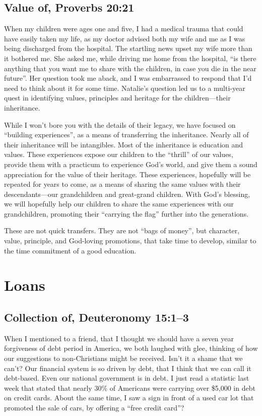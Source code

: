 \documentclass[12pt]{memoir}
\begin{document}
\subsection{Value of, Proverbs 20:21}

When my children were ages one and five, I had a medical trauma that
could have easily taken my life, as my doctor advised both my wife
and me as I was being discharged from the hospital. The startling
news upset my wife more than it bothered me. She asked me, while driving
me home from the hospital, ``is there anything that you want me to
share with the children, in case you die in the near future''. Her
question took me aback, and I was embarrassed to respond that I'd
need to think about it for some time. Natalie's question led us to
a multi-year quest in identifying values, principles and heritage
for the children---their inheritance.

While I won't bore you with the details of their legacy, we have focused
on ``building experiences'', as a means of transferring the inheritance.
Nearly all of their inheritance will be intangibles. Most of the inheritance
is education and values. These experiences expose our children to
the ``thrill'' of our values, provide them with a practicum to experience
God's world, and give them a sound appreciation for the value of their
heritage. These experiences, hopefully will be repeated for years
to come, as a means of sharing the same values with their descendants---our
grandchildren and great-grand children. With God's blessing, we will
hopefully help our children to share the same experiences with our
grandchildren, promoting their ``carrying the flag'' further into
the generations.

These are not quick transfers. They are not ``bags of money'', but
character, value, principle, and God-loving promotions, that take
time to develop, similar to the time commitment of a good education. 

\section{Loans}

\subsection{Collection of, Deuteronomy 15:1--3}

When I mentioned to a friend, that I thought we should have a seven
year forgiveness of debt period in America, we both laughed with glee,
thinking of how our suggestions to non-Christians might be received.
Isn't it a shame that we can't? Our financial system is so driven
by debt, that I think that we can call it debt-based. Even our national
government is in debt. I just read a statistic last week that stated
that nearly 30\% of Americans were carrying over \$5,000 in debt on
credit cards. About the same time, I saw a sign in front of a used
car lot that promoted the sale of cars, by offering a ``free credit
card''?
\end{document}
